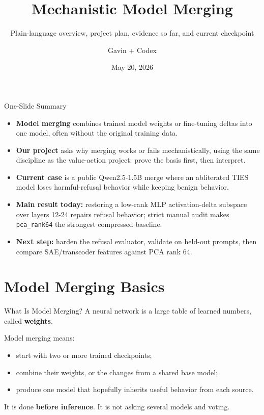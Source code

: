 \documentclass[aspectratio=169]{beamer}
\title[Mechanistic Model Merging]{Mechanistic Model Merging}
\subtitle{Plain-language overview, project plan, evidence so far, and current checkpoint}
\author{Gavin + Codex}
\date{May 20, 2026}
\begin{document}
\begin{frame}
  \titlepage
\end{frame}

\begin{frame}{One-Slide Summary}
  \begin{itemize}
    \item \textbf{Model merging} combines trained model weights or fine-tuning deltas into one model, often without the original training data.
    \item \textbf{Our project} asks why merging works or fails mechanistically, using the same discipline as the value-action project: prove the basis first, then interpret.
    \item \textbf{Current case} is a public Qwen2.5-1.5B merge where an abliterated TIES model loses harmful-refusal behavior while keeping benign behavior.
    \item \textbf{Main result today:} restoring a low-rank MLP activation-delta subspace over layers 12-24 repairs refusal behavior; strict manual audit makes \texttt{pca\_rank64} the strongest compressed baseline.
    \item \textbf{Next step:} harden the refusal evaluator, validate on held-out prompts, then compare SAE/transcoder features against PCA rank 64.
  \end{itemize}
\end{frame}

\section{Model Merging Basics}

\begin{frame}{What Is Model Merging?}
  A neural network is a large table of learned numbers, called \textbf{weights}.

  \vspace{0.35cm}
  Model merging means:
  \begin{itemize}
    \item start with two or more trained checkpoints;
    \item combine their weights, or the changes from a shared base model;
    \item produce one model that hopefully inherits useful behavior from each source.
  \end{itemize}

  \vspace{0.35cm}
  It is done \textbf{before inference}. It is not asking several models and voting.
\end{frame}
\end{document}
